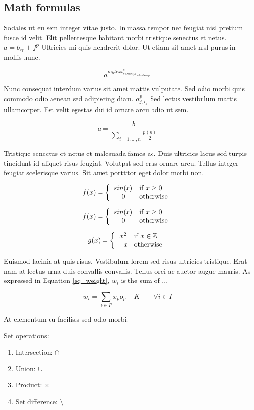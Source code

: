 \documentclass[]{article}
\newcommand{\twowaydef}[4]{
    \begin{equation}
        \label{eq_branch}
        #1 = \left\{
            \begin{array}[]{cl}
                #2 & \mbox{if $#3$} \\
                #4      & \mbox{otherwise}
            \end{array}
        \right.
    \end{equation}
}
\begin{document}
\subsection{Math formulas}

Sodales ut eu sem integer vitae justo. In massa tempor nec feugiat nisl pretium fusce id velit. Elit pellentesque habitant morbi tristique senectus et netus. $a = b_{cp} + f^p$ Ultricies mi quis hendrerit dolor. Ut etiam sit amet nisl purus in mollis nunc. 

\[
    a^{mytext^c_{subscript_{subsubscript}}}
\]

Nunc consequat interdum varius sit amet mattis vulputate. Sed odio morbi quis commodo odio aenean sed adipiscing diam. $a^p_{j,i_k}$ Sed lectus vestibulum mattis ullamcorper. Est velit egestas dui id ornare arcu odio ut sem.

\begin{equation}
    \label{eq_fraction}
    a = \frac{b}{\sum_{i=1,\dots,n} \frac{p(n)}{2}}
\end{equation}

Tristique senectus et netus et malesuada fames ac. Duis ultricies lacus sed turpis tincidunt id aliquet risus feugiat. Volutpat sed cras ornare arcu. Tellus integer feugiat scelerisque varius. Sit amet porttitor eget dolor morbi non.

\begin{equation}
    \label{eq_branch}
    f(x) = \left\{
        \begin{array}[]{cl}
            sin(x) & \mbox{if $x\ge 0$} \\
            0      & \mbox{otherwise}
        \end{array}
    \right.
\end{equation}

\twowaydef{f(x)}{sin(x)}{x\ge 0}{0}
\twowaydef{g(x)}{x^2}{x \in  \mathbb{Z}}{-x}

Euismod lacinia at quis risus. Vestibulum lorem sed risus ultricies tristique. Erat nam at lectus urna duis convallis convallis. Tellus orci ac auctor augue mauris. As expressed in Equation \ref{eq_weight}, $w_i$ is the sum of ...

\begin{equation}
    \label{eq_weight}
    w_i = \sum_{p \in P} x_p o_p - K
    \qquad
    \forall i \in I
\end{equation}

At elementum eu facilisis sed odio morbi. 

Set operations:
\begin{enumerate}
    \item Intersection: $\cap$
    \item Union: $\cup$
    \item Product: $\times$
    \item Set difference: $\setminus$
\end{enumerate}
\end{document}
